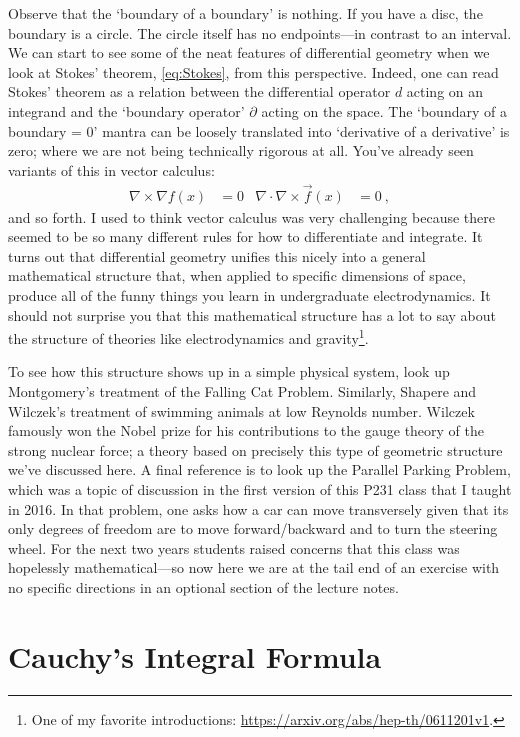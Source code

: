 Observe that the `boundary of a boundary' is nothing. If you have a disc, the boundary is a circle. The circle itself has no endpoints---in contrast to an interval. We can start to see some of the neat features of differential geometry when we look at Stokes' theorem, \eqref{eq:Stokes}, from this perspective. Indeed, one can read Stokes' theorem as a relation between the differential operator $d$ acting on an integrand and the `boundary operator' $\partial$  acting on the space. The `boundary of a boundary = 0' mantra can be loosely translated into `derivative of a derivative' is zero; where we are not being technically rigorous at all. You've already seen variants of this in vector calculus:
\begin{align}
  \nabla\times \nabla f(x) &= 0
  &
  \nabla \cdot \nabla\times \vec{f}(x) &=0 \ ,
\end{align}
and so forth. I used to think vector calculus was very challenging because there seemed to be so many different rules for how to differentiate and integrate. It turns out that differential geometry unifies this nicely into a general mathematical structure that, when applied to specific dimensions of space, produce all of the funny things you learn in undergraduate electrodynamics. It should not surprise you that this mathematical structure has a lot to say about the structure of theories like electrodynamics and gravity\footnote{One of my favorite introductions: \url{https://arxiv.org/abs/hep-th/0611201v1}.}.
\begin{exercise}
To see how this structure shows up in a simple physical system, look up Montgomery's treatment of the Falling Cat Problem. Similarly, Shapere and Wilczek's treatment of swimming animals at low Reynolds number. Wilczek famously won the Nobel prize for his contributions to the gauge theory of the strong nuclear force; a theory based on precisely this type of geometric structure we've discussed here. A final reference is to look up the Parallel Parking Problem, which was a topic of discussion in the first version of this P231 class that I taught in 2016. In that problem, one asks how a car can move transversely given that its only degrees of freedom are to move forward/backward and to turn the steering wheel. For the next two years students raised concerns that this class was hopelessly mathematical---so now here we are at the tail end of an exercise with no specific directions in an optional section of the lecture notes.
\end{exercise}


\section{Cauchy's Integral Formula}

